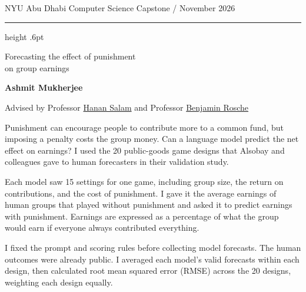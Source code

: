 \documentclass[11pt,a4paper]{article}
\newcommand{\minorheading}[1]{%
  \par\vspace{5pt}{\sffamily\bfseries\large\color{accent}#1}\par\nobreak}
\newcommand{\advisor}[2]{\href{#2}{#1}}
\begin{document}
\color{ink}
{\sffamily\small\color{muted} NYU Abu Dhabi \hfill Computer Science Capstone \enspace / \enspace November 2026}\par
{\color{accent}\hrule height .6pt}
\vspace{15pt}
{\fontsize{26}{29}\selectfont Forecasting the effect of punishment\\on group earnings\par}
\vspace{2pt}
{\sffamily\bfseries Ashmit Mukherjee}\par
{\sffamily\small Advised by Professor \advisor{Hanan Salam}{https://scholar.google.com/citations?user=9lTiKjwAAAAJ} and Professor \advisor{Benjamin Rosche}{https://scholar.google.com/citations?user=GAxIreYAAAAJ}}\par

\minorheading{The forecasting task}
Punishment can encourage people to contribute more to a common fund, but imposing a penalty costs the group money. Can a language model predict the net effect on earnings? I used the 20 public-goods game designs that Alsobay and colleagues gave to human forecasters in their validation study.

Each model saw 15 settings for one game, including group size, the return on contributions, and the cost of punishment. I gave it the average earnings of human groups that played without punishment and asked it to predict earnings with punishment. Earnings are expressed as a percentage of what the group would earn if everyone always contributed everything.

I fixed the prompt and scoring rules before collecting model forecasts. The human outcomes were already public. I averaged each model’s valid forecasts within each design, then calculated root mean squared error (RMSE) across the 20 designs, weighting each design equally.
\end{document}

